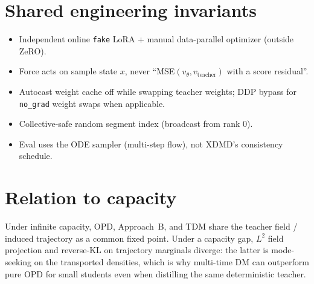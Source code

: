 \documentclass[11pt,a4paper]{article}
\begin{document}
\section{Shared engineering invariants}

\begin{itemize}[leftmargin=1.4em]
\item Independent online \texttt{fake} LoRA + manual data-parallel optimizer (outside ZeRO).
\item Force acts on sample state $x$, never ``MSE$(v_\theta,v_{\mathrm{teacher}})$ with a score residual''.
\item Autocast weight cache off while swapping teacher weights; DDP bypass for
\texttt{no\_grad} weight swaps when applicable.
\item Collective-safe random segment index (broadcast from rank 0).
\item Eval uses the ODE sampler (multi-step flow), not XDMD's consistency schedule.
\end{itemize}

\section{Relation to capacity}

Under infinite capacity, OPD, Approach~B, and TDM share the teacher field / induced
trajectory as a common fixed point. Under a capacity gap, $L^2$ field projection and
reverse-KL on trajectory marginals diverge: the latter is mode-seeking on the transported
densities, which is why multi-time DM can outperform pure OPD for small students even when
distilling the same deterministic teacher.
\end{document}
